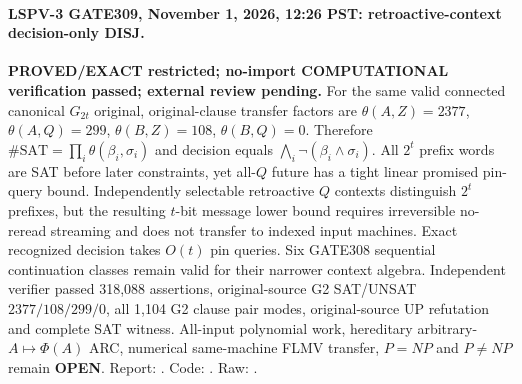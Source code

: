 \paragraph{LSPV-3 GATE309, November 1, 2026, 12:26 PST: retroactive-context decision-only DISJ.}
\textbf{PROVED/EXACT restricted; no-import COMPUTATIONAL verification passed; external review pending.}
For the same valid connected canonical $G_{2t}$ original, original-clause transfer factors are $\theta(A,Z)=2377$, $\theta(A,Q)=299$, $\theta(B,Z)=108$, $\theta(B,Q)=0$. Therefore $\#\mathrm{SAT}=\prod_i\theta(\beta_i,\sigma_i)$ and decision equals $\bigwedge_i\neg(\beta_i\land\sigma_i)$. All $2^t$ prefix words are SAT before later constraints, yet all-$Q$ future has a tight linear promised pin-query bound. Independently selectable retroactive $Q$ contexts distinguish $2^t$ prefixes, but the resulting $t$-bit message lower bound requires irreversible no-reread streaming and does not transfer to indexed input machines. Exact recognized decision takes $O(t)$ pin queries. Six GATE308 sequential continuation classes remain valid for their narrower context algebra. Independent verifier passed 318,088 assertions, original-source G2 SAT/UNSAT $2377/108/299/0$, all 1,104 G2 clause pair modes, original-source UP refutation and complete SAT witness. All-input polynomial work, hereditary arbitrary-$A\mapsto\Phi(A)$ ARC, numerical same-machine FLMV transfer, $P=NP$ and $P\ne NP$ remain \textbf{OPEN}. Report: . Code: . Raw: .
